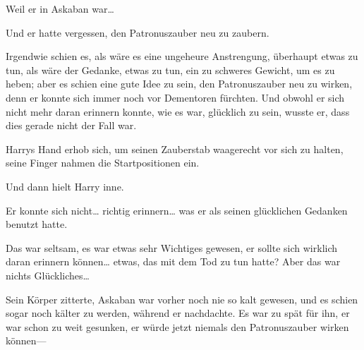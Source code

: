 Weil er in Askaban war…

Und er hatte vergessen, den Patronuszauber neu zu zaubern.

Irgendwie schien es, als wäre es eine ungeheure Anstrengung, überhaupt etwas zu tun, als wäre der Gedanke, etwas zu tun, ein zu schweres Gewicht, um es zu heben; aber es schien eine gute Idee zu sein, den Patronuszauber neu zu wirken, denn er konnte sich immer noch vor Dementoren fürchten. Und obwohl er sich nicht mehr daran erinnern konnte, wie es war, glücklich zu sein, wusste er, dass dies gerade nicht der Fall war.

Harrys Hand erhob sich, um seinen Zauberstab waagerecht vor sich zu halten, seine Finger nahmen die Startpositionen ein.

Und dann hielt Harry inne.

Er konnte sich nicht… richtig erinnern… was er als seinen glücklichen Gedanken benutzt hatte.

Das war seltsam, es war etwas sehr Wichtiges gewesen, er sollte sich wirklich daran erinnern können… etwas, das mit dem Tod zu tun hatte? Aber das war nichts Glückliches…

Sein Körper zitterte, Askaban war vorher noch nie so kalt gewesen, und es schien sogar noch kälter zu werden, während er nachdachte. Es war zu spät für ihn, er war schon zu weit gesunken, er würde jetzt niemals den Patronuszauber wirken können—

